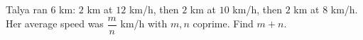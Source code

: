 Talya ran $6$ km: $2$ km at $12$ km/h, then $2$ km at $10$ km/h, then $2$ km at $8$ km/h. Her average speed was $\dfrac {m}{n}$ km/h with $m,n$ coprime. Find $m+n$.
